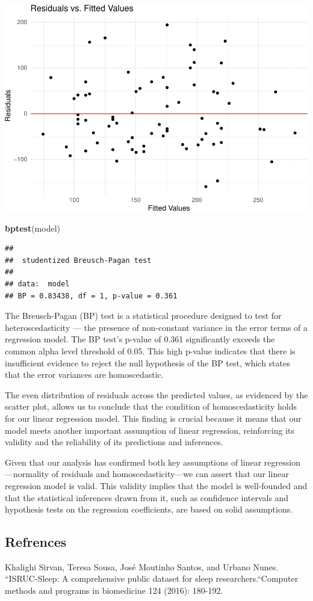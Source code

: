 \documentclass[
]{article}
\newenvironment{Shaded}{\begin{snugshade}}{\end{snugshade}}
\newcommand{\FunctionTok}[1]{\textcolor[rgb]{0.13,0.29,0.53}{\textbf{#1}}}
\newcommand{\NormalTok}[1]{#1}
\begin{document}
\includegraphics{602_project_files/figure-latex/unnamed-chunk-24-1.pdf}

\begin{Shaded}
\begin{Highlighting}[]
\FunctionTok{bptest}\NormalTok{(model)}
\end{Highlighting}
\end{Shaded}

\begin{verbatim}
## 
##  studentized Breusch-Pagan test
## 
## data:  model
## BP = 0.83438, df = 1, p-value = 0.361
\end{verbatim}

The Breusch-Pagan (BP) test is a statistical procedure designed to test
for heteroscedasticity --- the presence of non-constant variance in the
error terms of a regression model. The BP test's p-value of 0.361
significantly exceeds the common alpha level threshold of 0.05. This
high p-value indicates that there is insufficient evidence to reject the
null hypothesis of the BP test, which states that the error variances
are homoscedastic.

The even distribution of residuals across the predicted values, as
evidenced by the scatter plot, allows us to conclude that the condition
of homoscedasticity holds for our linear regression model. This finding
is crucial because it means that our model meets another important
assumption of linear regression, reinforcing its validity and the
reliability of its predictions and inferences.

Given that our analysis has confirmed both key assumptions of linear
regression---normality of residuals and homoscedasticity---we can assert
that our linear regression model is valid. This validity implies that
the model is well-founded and that the statistical inferences drawn from
it, such as confidence intervals and hypothesis tests on the regression
coefficients, are based on solid assumptions.

\subsection{Refrences}\label{refrences}

Khalighi Sirvan, Teresa Sousa, José Moutinho Santos, and Urbano Nunes.
``ISRUC-Sleep: A comprehensive public dataset for sleep
researchers.``Computer methods and programs in biomedicine 124 (2016):
180-192.
\end{document}
